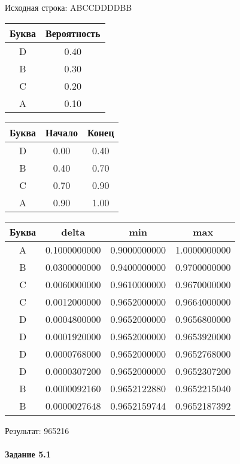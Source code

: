\documentclass[a4paper, 12pt]{article}
\begin{document}
Исходная строка: ABCCDDDDBB\
\begin{center}
 \begin{tabular}{ |c|c| } 
  \hline
     Буква & Вероятность \\ \hline
D & 0.40\\\hline
B & 0.30\\\hline
C & 0.20\\\hline
A & 0.10
\\ \hline \end{tabular}
\end{center}
\begin{center}
 \begin{tabular}{ |c|c|c| } 
  \hline
     Буква & Начало & Конец \\ \hline
D & 0.00 & 0.40\\\hline
B & 0.40 & 0.70\\\hline
C & 0.70 & 0.90\\\hline
A & 0.90 & 1.00
\\ \hline \end{tabular}
\end{center}
\begin{center}
 \begin{tabular}{ |c|c|c|c| } 
  \hline
     Буква & delta & min & max \\ \hline
A & 0.1000000000 & 0.9000000000 & 1.0000000000\\\hline
B & 0.0300000000 & 0.9400000000 & 0.9700000000\\\hline
C & 0.0060000000 & 0.9610000000 & 0.9670000000\\\hline
C & 0.0012000000 & 0.9652000000 & 0.9664000000\\\hline
D & 0.0004800000 & 0.9652000000 & 0.9656800000\\\hline
D & 0.0001920000 & 0.9652000000 & 0.9653920000\\\hline
D & 0.0000768000 & 0.9652000000 & 0.9652768000\\\hline
D & 0.0000307200 & 0.9652000000 & 0.9652307200\\\hline
B & 0.0000092160 & 0.9652122880 & 0.9652215040\\\hline
B & 0.0000027648 & 0.9652159744 & 0.9652187392
\\ \hline \end{tabular}
\end{center}
Результат: 965216
\pagebreak
\paragraph{Задание 5.1}
\end{document}
